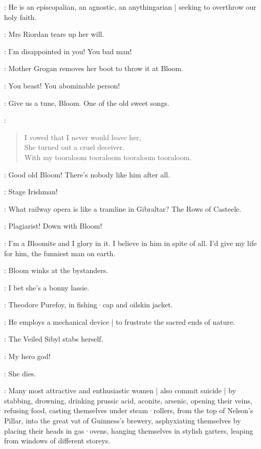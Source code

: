 \FatherFarley[1]:
He is an episcopalian,
an agnostic,
an anythingarian |
seeking to overthrow our holy faith.

:
Mrs Riordan tears up her will.

\MrsRiordan:
I'm disappointed in you!
You bad man!

:
Mother Grogan removes her boot to throw it at Bloom.

\MotherGrogan:
You beast!
You abominable person!

\NoseyFlynn[2]:
Give us a tune,
Bloom.
One of the old sweet songs.

\Bloom:
\begin{verse}
    I vowed that I never would leave her,\\
    She turned out a cruel deceiver.\\
    With my tooraloom tooraloom tooraloom tooraloom.
\end{verse}

\HoppyHolohan[1]:
Good old Bloom!
There's nobody like him after all.

\PaddyLeonard[2]:
Stage Irishman!

\Bloom:
What railway opera is like a tramline in Gibraltar?
The Rows of Casteele.


\Lenehan[1]:
Plagiarist!
Down with Bloom!

\VeiledSibyl[2]:
I'm a Bloomite and I glory in it.
I believe in him in spite of all.
I'd give my life for him,
the funniest man on earth.

:
Bloom winks at the bystanders.

\Bloom:
I bet she's a bonny lassie.

:
Theodore Purefoy,
in fishing·cap and oilskin jacket.

\TheodorePurefoy:
He employs a mechanical device |
to frustrate the sacred ends of nature.

:
The Veiled Sibyl stabs herself.

\VeiledSibyl:
My hero god!

:
She dies.

:
Many most attractive and enthusiastic women |
also commit suicide |
by stabbing,
drowning,
drinking prussic acid,
aconite,
arsenic,
opening their veins,
refusing food,
casting themselves under steam·rollers,
from the top of Nelson's Pillar,
into the great vat of Guinness's brewery,
asphyxiating themselves by placing their heads in gas·ovens,
hanging themselves in stylish garters,
leaping from windows of different storeys.

